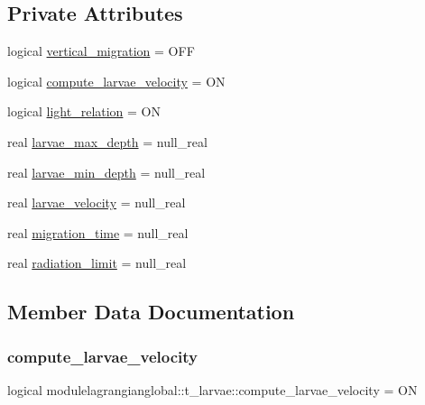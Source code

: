 \subsection*{Private Attributes}
\begin{DoxyCompactItemize}
\item 
logical \mbox{\hyperlink{structmodulelagrangianglobal_1_1t__larvae_aafa4ed785ca2f69e8e2d57cdf18af458}{vertical\+\_\+migration}} = O\+FF
\item 
logical \mbox{\hyperlink{structmodulelagrangianglobal_1_1t__larvae_a0b552895ea95efd074b99bdb683a9a88}{compute\+\_\+larvae\+\_\+velocity}} = ON
\item 
logical \mbox{\hyperlink{structmodulelagrangianglobal_1_1t__larvae_a56fee0c1924ef45cd1374af27e8315fc}{light\+\_\+relation}} = ON
\item 
real \mbox{\hyperlink{structmodulelagrangianglobal_1_1t__larvae_a8b40707a59e6e24bbf8053cfcd10a5c7}{larvae\+\_\+max\+\_\+depth}} = null\+\_\+real
\item 
real \mbox{\hyperlink{structmodulelagrangianglobal_1_1t__larvae_a83b2d66caec91a7499b7c09a4314905d}{larvae\+\_\+min\+\_\+depth}} = null\+\_\+real
\item 
real \mbox{\hyperlink{structmodulelagrangianglobal_1_1t__larvae_a370765134014f839549e30e87e14094f}{larvae\+\_\+velocity}} = null\+\_\+real
\item 
real \mbox{\hyperlink{structmodulelagrangianglobal_1_1t__larvae_a517b832a25d19f5790740e2d1a6ac40d}{migration\+\_\+time}} = null\+\_\+real
\item 
real \mbox{\hyperlink{structmodulelagrangianglobal_1_1t__larvae_a0e6d10983097bf4b24da41cfaa29ce5e}{radiation\+\_\+limit}} = null\+\_\+real
\end{DoxyCompactItemize}


\subsection{Member Data Documentation}
\mbox{\label{structmodulelagrangianglobal_1_1t__larvae_a0b552895ea95efd074b99bdb683a9a88}} 
\subsubsection{\texorpdfstring{compute\+\_\+larvae\+\_\+velocity}{compute\_larvae\_velocity}}
{\footnotesize\ttfamily logical modulelagrangianglobal\+::t\+\_\+larvae\+::compute\+\_\+larvae\+\_\+velocity = ON\hspace{0.3cm}{\ttfamily [private]}}

